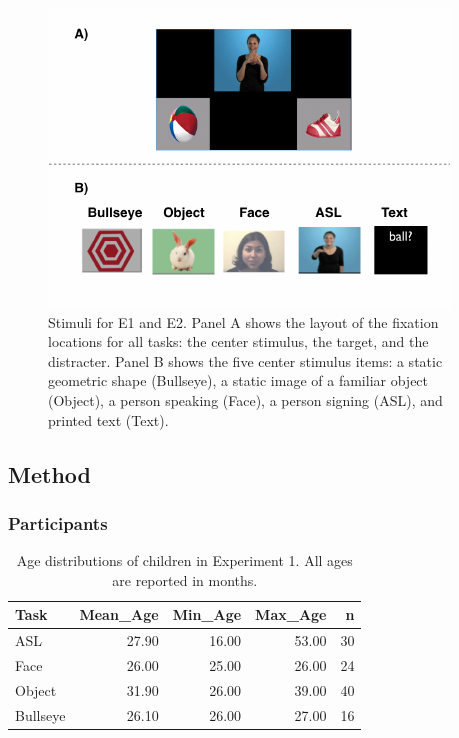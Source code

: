 \documentclass[10pt, letterpaper]{article}
\newenvironment{CodeChunk}{}{}
\begin{document}
\begin{CodeChunk}
\begin{figure}[t]

{\centering \includegraphics{figs/e1_stim-1} 

}

\caption[Stimuli for E1 and E2]{Stimuli for E1 and E2. Panel A shows the layout of the fixation locations for all tasks: the center stimulus, the target, and the distracter. Panel B shows the five center stimulus items: a static geometric shape (Bullseye), a static image of a familiar object (Object), a person speaking (Face), a person signing (ASL), and printed text (Text).}\label{fig:e1_stim}
\end{figure}
\end{CodeChunk}

\subsection{Method}\label{method}

\subsubsection{Participants}\label{participants}

\begin{table}[b]
\centering
\begin{tabular}{lrrrr}
  \hline
Task & Mean\_Age & Min\_Age & Max\_Age & n \\ 
  \hline
ASL & 27.90 & 16.00 & 53.00 &  30 \\ 
  Face & 26.00 & 25.00 & 26.00 &  24 \\ 
  Object & 31.90 & 26.00 & 39.00 &  40 \\ 
  Bullseye & 26.10 & 26.00 & 27.00 &  16 \\ 
   \hline
\end{tabular}
\caption{Age distributions of children in Experiment 1. All ages are reported in months.} 
\end{table}
\end{document}
